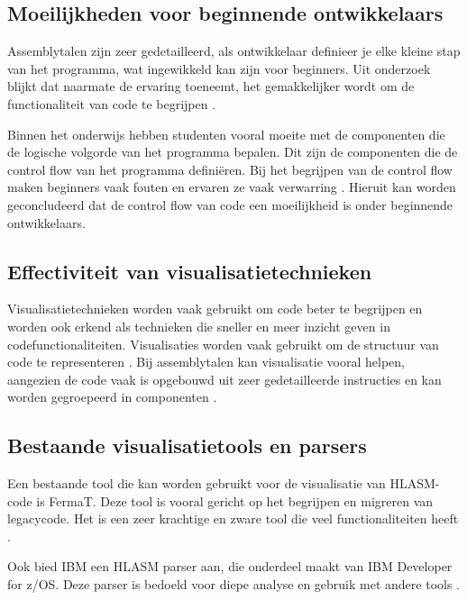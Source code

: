 \subsection{Moeilijkheden voor beginnende ontwikkelaars}

Assemblytalen zijn zeer gedetailleerd, als ontwikkelaar definieer je elke kleine stap van het programma, wat ingewikkeld kan zijn voor beginners. Uit onderzoek blijkt dat naarmate de ervaring toeneemt, het gemakkelijker wordt om de functionaliteit van code te begrijpen \autocite{feigenspan_kästner_liebig_apel_hanenberg_2012}.

Binnen het onderwijs hebben studenten vooral moeite met de componenten die de logische volgorde van het programma bepalen. Dit zijn de componenten die de control flow van het programma definiëren. Bij het begrijpen van de control flow maken beginners vaak fouten en ervaren ze vaak verwarring \autocite{kawash_2024}. Hieruit kan worden geconcludeerd dat de control flow van code een moeilijkheid is onder beginnende ontwikkelaars.

\subsection{Effectiviteit van visualisatietechnieken}

Visualisatietechnieken worden vaak gebruikt om code beter te begrijpen en worden ook erkend als technieken die sneller en meer inzicht geven in codefunctionaliteiten. Visualisaties worden vaak gebruikt om de structuur van code te representeren \autocite{storey_2005}. Bij assemblytalen kan visualisatie vooral helpen, aangezien de code vaak is opgebouwd uit zeer gedetailleerde instructies en kan worden gegroepeerd in componenten \autocite{baldwin_myers_storey_coady_2009}.

\subsection{Bestaande visualisatietools en parsers}

Een bestaande tool die kan worden gebruikt voor de visualisatie van HLASM-code is FermaT. Deze tool is vooral gericht op het begrijpen en migreren van legacycode. Het is een zeer krachtige en zware tool die veel functionaliteiten heeft \autocite{ward_2001}.

Ook bied IBM een HLASM parser aan, die onderdeel maakt van IBM Developer for z/OS. Deze parser is bedoeld voor diepe analyse en gebruik met andere tools \autocite{ibm_hlasm_parser}.

